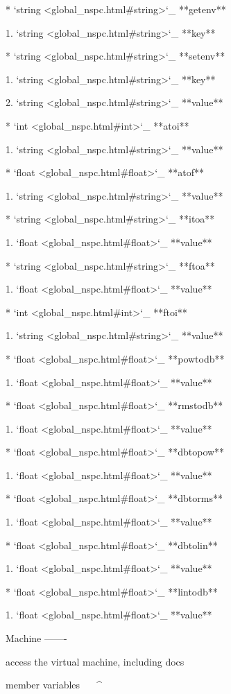 	* `string <global_nspc.html#string>`_ **getenv**

		1. `string <global_nspc.html#string>`_ **key**

	* `string <global_nspc.html#string>`_ **setenv**

		1. `string <global_nspc.html#string>`_ **key**

		2. `string <global_nspc.html#string>`_ **value**

	* `int <global_nspc.html#int>`_ **atoi**

		1. `string <global_nspc.html#string>`_ **value**

	* `float <global_nspc.html#float>`_ **atof**

		1. `string <global_nspc.html#string>`_ **value**

	* `string <global_nspc.html#string>`_ **itoa**

		1. `float <global_nspc.html#float>`_ **value**

	* `string <global_nspc.html#string>`_ **ftoa**

		1. `float <global_nspc.html#float>`_ **value**

	* `int <global_nspc.html#int>`_ **ftoi**

		1. `string <global_nspc.html#string>`_ **value**

	* `float <global_nspc.html#float>`_ **powtodb**

		1. `float <global_nspc.html#float>`_ **value**

	* `float <global_nspc.html#float>`_ **rmstodb**

		1. `float <global_nspc.html#float>`_ **value**

	* `float <global_nspc.html#float>`_ **dbtopow**

		1. `float <global_nspc.html#float>`_ **value**

	* `float <global_nspc.html#float>`_ **dbtorms**

		1. `float <global_nspc.html#float>`_ **value**

	* `float <global_nspc.html#float>`_ **dbtolin**

		1. `float <global_nspc.html#float>`_ **value**

	* `float <global_nspc.html#float>`_ **lintodb**

		1. `float <global_nspc.html#float>`_ **value**

Machine
-------

access the virtual machine, including docs

member variables
^^^^^^^^^^^^^^^^

